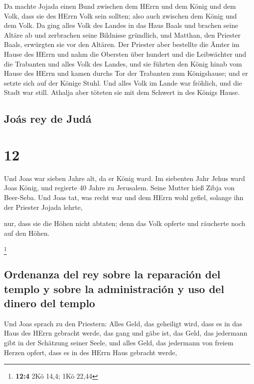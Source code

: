  Da machte Jojada einen Bund zwischen dem HErrn und dem
König und dem Volk, dass sie des HErrn Volk sein sollten; also auch
zwischen dem König und dem Volk.  Da ging alles Volk des
Landes in das Haus Baals und brachen seine Altäre ab und zerbrachen
seine Bildnisse gründlich, und Matthan, den Priester Baals, erwürgten
sie vor den Altären. Der Priester aber bestellte die Ämter im Hause des
HErrn  und nahm die Obersten über hundert und die
Leibwächter und die Trabanten und alles Volk des Landes, und sie führten
den König hinab vom Hause des HErrn und kamen durchs Tor der Trabanten
zum Königshause; und er setzte sich auf der Könige Stuhl.
 Und alles Volk im Lande war fröhlich, und die Stadt war
still. Athalja aber töteten sie mit dem Schwert in des Königs Hause.

\hypertarget{jouxe1s-rey-de-juduxe1}{%
\subsection{Joás rey de Judá}\label{jouxe1s-rey-de-juduxe1}}

\hypertarget{section-11}{%
\section{12}\label{section-11}}

 Und Joas war sieben Jahre alt, da er König ward.
 Im siebenten Jahr Jehus ward Joas König, und regierte 40
Jahre zu Jerusalem. Seine Mutter hieß Zibja von Beer-Seba.
 Und Joas tat, was recht war und dem HErrn wohl gefiel,
solange ihn der Priester Jojada lehrte,

 nur, dass sie die Höhen nicht abtaten; denn das Volk
opferte und räucherte noch auf den Höhen.

\footnote{\textbf{12:4} 2Kö 14,4; 1Kö 22,44}

\hypertarget{ordenanza-del-rey-sobre-la-reparaciuxf3n-del-templo-y-sobre-la-administraciuxf3n-y-uso-del-dinero-del-templo}{%
\subsection{Ordenanza del rey sobre la reparación del templo y sobre la
administración y uso del dinero del
templo}\label{ordenanza-del-rey-sobre-la-reparaciuxf3n-del-templo-y-sobre-la-administraciuxf3n-y-uso-del-dinero-del-templo}}

 Und Joas sprach zu den Priestern: Alles Geld, das
geheiligt wird, dass es in das Haus des HErrn gebracht werde, das gang
und gäbe ist, das Geld, das jedermann gibt in der Schätzung seiner
Seele, und alles Geld, das jedermann von freiem Herzen opfert, dass es
in des HErrn Haus gebracht werde,

